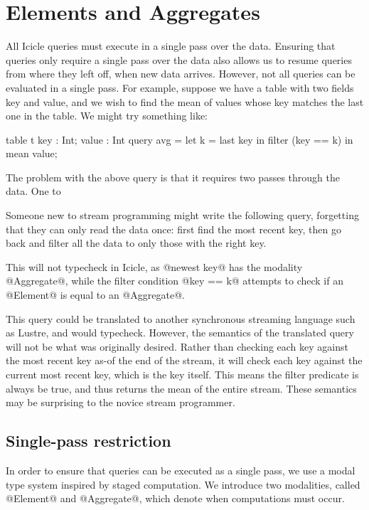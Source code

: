 
\eject
\section{Elements and Aggregates}

All Icicle queries must execute in a single pass over the data. Ensuring that queries only require a single pass over the data also allows us to resume queries from where they left off, when new data arrives. However, not all queries can be evaluated in a single pass. For example, suppose we have a table with two fields key and value, and we wish to find the mean of values whose key matches the last one in the table. We might try something like:

\begin{code}
  table t { key : Int; value : Int }
  query avg = let k    = last key
              in  filter (key == k) in mean value;
\end{code}
The problem with the above query is that it requires two passes through the data. One to 


Someone new to stream programming might write the following query, forgetting that they can only read the data once: first find the most recent key, then go back and filter all the data to only those with the right key.

This will not typecheck in Icicle, as @newest key@ has the modality @Aggregate@, while the filter condition @key == k@ attempts to check if an @Element@ is equal to an @Aggregate@.

This query could be translated to another synchronous streaming language such as {\sc Lustre}\cite{halbwachs1991synchronous}, and would typecheck.
However, the semantics of the translated query will not be what was originally desired.
Rather than checking each key against the most recent key as-of the end of the stream,
it will check each key against the current most recent key, which is the key itself.
This means the filter predicate is always be true, and thus returns the mean of the entire stream.
These semantics may be surprising to the novice stream programmer.

\subsection{Single-pass restriction}


In order to ensure that queries can be executed as a single pass, we use a modal type system inspired by staged computation\cite{davies2001modal}.
We introduce two modalities, called @Element@ and @Aggregate@, which denote when computations must occur.

